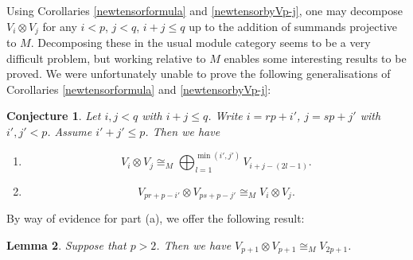\documentclass[a4paper]{amsart}
\newtheorem{Lemma}{Lemma}[section]
\newtheorem{Conj}[Lemma]{Conjecture}
\theoremstyle{definition}
\theoremstyle{remark}
\theoremstyle{Acknowledgments}
\begin{document}
Using Corollaries \ref{newtensorformula} and \ref{newtensorbyVp-j}, one may decompose $V_i \otimes V_j$ for any $i<p$, $j<q$, $i+j \leq q$ up to the addition of summands projective to $M$. Decomposing these in the usual module category seems to be a very difficult problem, but working relative to $M$ enables some interesting results to be proved. We were unfortunately unable to prove the following generalisations of Corollaries \ref{newtensorformula} and \ref{newtensorbyVp-j}:

\begin{Conj}\label{conj} Let $i,j<q$ with $i+j \leq q$. Write $i=rp+i'$, $j=sp+j'$ with $i',j'<p$. Assume $i'+j' \leq p$. Then we have
\begin{enumerate} 
\item[(a)] $$V_i \otimes V_j \cong_M \bigoplus_{l=1}^{\min(i',j')} V_{i+j-(2l-1)}.$$
\item[(b)] $$V_{pr+p-i'} \otimes V_{ps+p-j'} \cong_M V_i \otimes V_j.$$
\end{enumerate}
\end{Conj}

By way of evidence for part (a), we offer the following result:

\begin{Lemma}\label{notenough} Suppose that $p>2$. Then we have $V_{p+1} \otimes V_{p+1} \cong_M V_{2p+1}$.
\end{Lemma}
\end{document}
